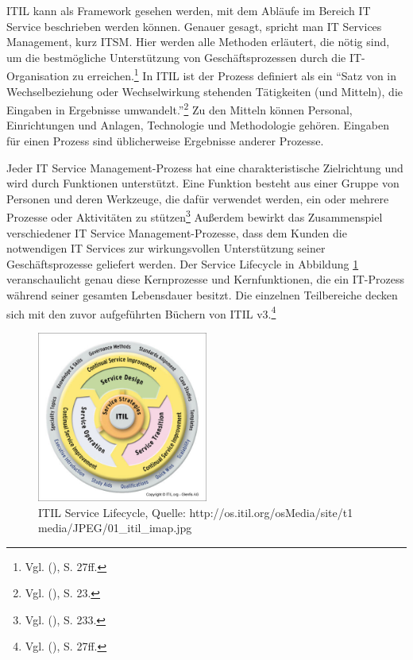\noindent
ITIL kann als Framework gesehen werden, mit dem Abläufe im Bereich IT Service beschrieben werden können. Genauer gesagt, spricht man IT Services Management, kurz ITSM. Hier werden alle Methoden erläutert, die nötig sind, um die bestmögliche Unterstützung von Geschäftsprozessen durch die IT-Organisation zu erreichen.\footnote{Vgl. \citeauthor{Ebel} (\citeyear{Ebel}), S. 27ff.} In ITIL ist der Prozess definiert als ein \enquote{Satz von in Wechselbeziehung oder Wechselwirkung stehenden Tätigkeiten (und Mitteln), die Eingaben in Ergebnisse umwandelt.}\footnote{Vgl. \citeauthor{ISO9000} (\citeyear{ISO9000}), S. 23.} Zu den Mitteln können Personal, Einrichtungen und Anlagen, Technologie und Methodologie gehören. Eingaben für einen Prozess sind üblicherweise  Ergebnisse anderer Prozesse.

\noindent
Jeder IT Service Management-Prozess hat eine charakteristische Zielrichtung und wird durch Funktionen unterstützt. Eine Funktion besteht aus einer Gruppe von Personen und deren Werkzeuge, die dafür verwendet werden, ein oder mehrere Prozesse oder Aktivitäten zu stützen\footnote{Vgl. \citeauthor{Cannon} (\citeyear{Cannon}), S. 233.} Außerdem bewirkt das Zusammenspiel verschiedener IT Service Management-Prozesse, dass dem Kunden die notwendigen IT Services zur wirkungsvollen Unterstützung seiner Geschäftsprozesse geliefert werden. Der Service Lifecycle in Abbildung \ref{fig:ITIL_Lebenyzyklus} veranschaulicht genau diese Kernprozesse und Kernfunktionen, die ein IT-Prozess während seiner gesamten Lebensdauer besitzt. Die einzelnen Teilbereiche decken sich mit den zuvor aufgeführten Büchern von ITIL v3.\footnote{Vgl. \citeauthor{Ebel} (\citeyear{Ebel}), S. 27ff.}

\begin{figure}[h!]
\centering
	\includegraphics[width=0.50\textwidth]{Abbildungen/ITIL_Lebenszyklus}
	\caption[ITIL Service Lifecycle]{ITIL Service Lifecycle, Quelle: http://os.itil.org/osMedia/site/t1 
	media/JPEG/01\_itil\_imap.jpg}
	\label{fig:ITIL_Lebenyzyklus}
\end{figure}

